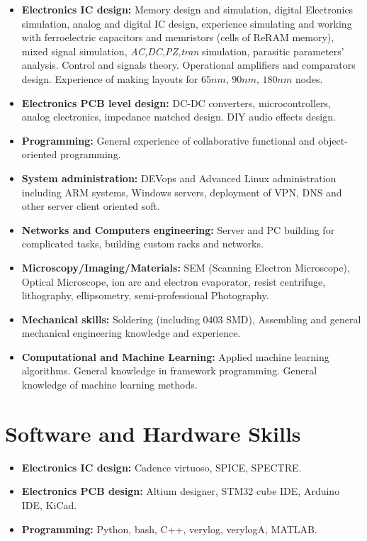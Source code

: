 \documentclass{article}
\begin{document}
\begin{itemize}
\item \textbf{Electronics IC design:} Memory design and simulation, digital Electronics simulation, analog and digital IC design, experience simulating and working with ferroelectric capacitors and memristors (cells of ReRAM memory),   mixed signal simulation, \textit{AC,DC,PZ,tran} simulation, parasitic parameters' analysis. Control and signals theory. Operational amplifiers and comparators design. Experience of making layouts for $65 nm$, $90nm$, $180nm$ nodes. 
\item \textbf{Electronics PCB level design:} DC-DC converters, microcontrollers, analog electronics, impedance matched design. DIY audio effects design. 
\item \textbf{Programming:} General experience of collaborative functional and object-oriented programming.
\item \textbf{System administration:} DEVops and Advanced Linux administration including ARM systems, Windows servers, deployment of VPN, DNS and other server client oriented soft.
\item \textbf{Networks and Computers engineering:} Server and PC building for complicated tasks, building custom racks and networks.
\item \textbf{Microscopy/Imaging/Materials:} SEM (Scanning Electron Microscope), Optical Microscope, ion arc and electron evaporator, resist centrifuge, lithography, ellipsometry, semi-professional Photography.
\item \textbf{Mechanical skills:} Soldering (including 0403 SMD), Assembling and general mechanical engineering knowledge and experience.
\item \textbf{Computational and Machine Learning:} Applied machine learning algorithms. General knowledge in framework programming. General knowledge of machine learning methods.
\end{itemize}
 
\section{Software and Hardware Skills}
\begin{itemize}
\item \textbf{Electronics IC design:} Cadence virtuoso, SPICE, SPECTRE.
\item \textbf{Electronics PCB design:} Altium designer, STM32 cube IDE, Arduino IDE, KiCad.
\item \textbf{Programming:} Python, bash, C++, verylog, verylogA, MATLAB.
\end{itemize}
 
\end{document}
